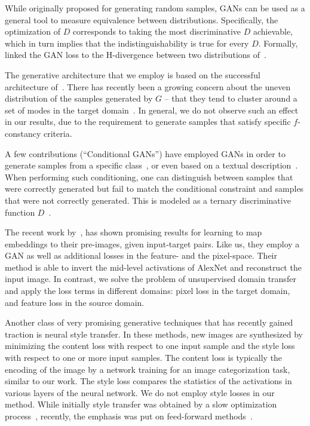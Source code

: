 \documentclass{article} %
\begin{document}
While originally proposed for generating random samples, GANs can be used as a general tool to measure equivalence between distributions. Specifically, the optimization of $D$ corresponds to taking the most discriminative $D$ achievable, which in turn implies that the indistinguishability is true for every $D$. Formally,~\citet{domaingan} linked the GAN loss to the H-divergence between two distributions of~\citet{bendavid}.

The generative architecture that we employ is based on the successful architecture of~\citet{dcgan}. There has recently been a growing concern about the uneven distribution of the samples generated by $G$ -- that they tend to cluster around a set of modes in the target domain~\citep{gantricks}. In general, we do not observe such an effect in our results, due to the requirement to generate samples that satisfy specific $f$-constancy criteria. 

A few contributions (``Conditional GANs'') have employed GANs in order to generate samples from a specific class~\citep{mirza2014conditional}, or even based on a textual description~\citep{RAYLLS16}. When performing such conditioning, one can distinguish between samples that were correctly generated but fail to match the conditional constraint and samples that were not correctly generated. This is modeled as a ternary discriminative function $D$~\citep{RAYLLS16,introspectivegan}.

The recent work by~\citet{deepsim}, has shown promising results for learning to map embeddings to their pre-images, given input-target pairs. Like us, they employ a GAN as well as additional losses in the feature- and the pixel-space. Their method is able to invert the mid-level activations of AlexNet and reconstruct the input image. In contrast, we solve the problem of unsupervised domain transfer and apply the loss terms in different domains: pixel loss in the target domain, and feature loss in the source domain. 

Another class of very promising generative techniques that has recently gained traction is neural style transfer. In these methods, new images are synthesized by minimizing the content loss with respect to one input sample and the style loss with respect to one or more input samples. The content loss is typically the encoding of the image by a network training for an image categorization task, similar to our work. The style loss compares the statistics of the activations in various layers of the neural network. We do not employ style losses in our method. While initially style transfer was obtained by a slow optimization process~\citep{styletransfer}, recently, the emphasis was put on feed-forward methods~\citep{ulyanov16texture,Johnson2016Perceptual}. 
\end{document}
